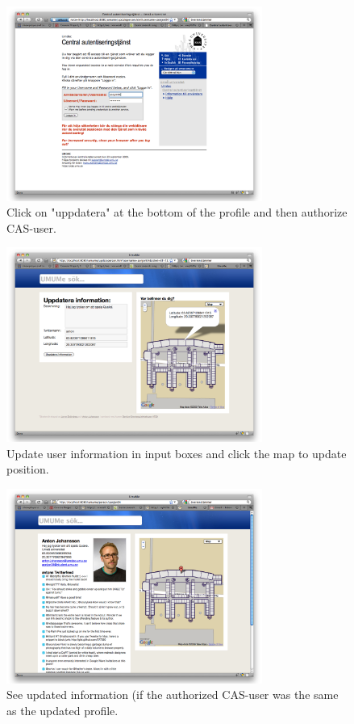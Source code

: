 \documentclass[titlepage, twocolumn, a4paper, 10pt]{article}
\begin{document}
\begin{figure}[H]
  \centering
  \includegraphics[width=3.3in]{images/pic4.png}
  \caption{Click on "uppdatera" at the bottom of the profile and then authorize CAS-user.}
  \label{fig:images/cas}
\end{figure}

\begin{figure}[H]
  \centering
  \includegraphics[width=3.3in]{images/pic5.png}
  \caption{Update user information in input boxes and click the map to
  update position.}
  \label{fig:images/edit}
\end{figure}

\begin{figure}[H]
  \centering
  \includegraphics[width=3.3in]{images/pic6.png}
  \caption{See updated information (if the authorized CAS-user was the same as the updated profile.}
  \label{fig:images/edited-user}
\end{figure}
\newpage
\end{document}
